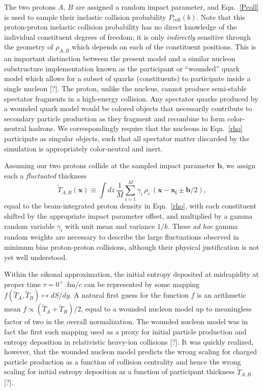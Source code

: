 \documentclass[aps,prc,reprint,amsmath,nofootinbib]{revtex4-1}
\newcommand{\T}{\tilde{T}}
\newcommand{\x}{\mathbf{x}}
\newcommand{\note}{\textcolor{theblue}{[?]}}
\begin{document}
The two protons $A$, $B$ are assigned a random impact parameter, and Eqn.~\eqref{Pcoll} is used to sample their inelastic collision probability $P_\mathrm{coll}(b)$.
Note that this proton-proton inelastic collision probability has no direct knowledge of the individual constituent degrees of freedom; it is only \emph{indirectly} sensitive through the geometry of $\rho_{A, B}$ which depends on each of the constituent positions.
This is an important distinction between the present model and a similar nucleon substructure implementation known as the participant or ``wounded'' quark model which allows for a subset of quarks (constituents) to participate inside a single nucleon \note.
The proton, unlike the nucleus, cannot produce semi-stable spectator fragments in a high-energy collision.
Any spectator quarks produced by a wounded quark model would be colored objects that necessarily contribute to secondary particle production as they fragment and recombine to form color-neutral hadrons.
We correspondingly require that the nucleons in Eqn.~\eqref{rho} participate as singular objects, such that all spectator matter discarded by the simulation is appropriately color-neutral and inert.

Assuming our two protons collide at the sampled impact parameter $\mathbf{b}$, we assign each a \emph{fluctuated} thickness
\begin{equation}
  \label{fluctuated_thick}
  \T_{A, B}(\x) \equiv \int dz\, \frac{1}{M} \sum\limits_{i=1}^M \gamma_i\, \rho_c \,(\mathbf{x} - \mathbf{x_i} \pm \mathbf{b}/2),
\end{equation}
equal to the beam-integrated proton density in Eqn.~\eqref{rho}, with each constituent shifted by the appropriate impact parameter offset, and multiplied by a gamma random variable $\gamma_i$ with unit mean and variance $1/k$.
These \emph{ad hoc} gamma random weights are necessary to describe the large fluctuations observed in minimum bias proton-proton collisions, although their physical justification is not yet well understood.

Within the eikonal approximation, the initial entropy deposited at midrapidity at proper time $\tau=0^+$~fm/$c$ can be represented by some mapping ${f(\T_A, \T_B) \mapsto dS/dy}$.
A natural first guess for the function $f$ is an arithmetic mean $f \propto (\T_A + \T_B)/2$, equal to a wounded nucleon model up to meaningless factor of two in the overall normalization.
The wounded nucleon model was in fact the first such mapping used as a proxy for initial particle production and entropy deposition in relativistic heavy-ion collisions \note.
It was quickly realized, however, that the wounded nucleon model predicts the wrong scaling for charged particle production as a function of collision centrality and hence the wrong scaling for initial entropy deposition as a function of participant thickness $\T_{A,B}$ \note.
\end{document}

